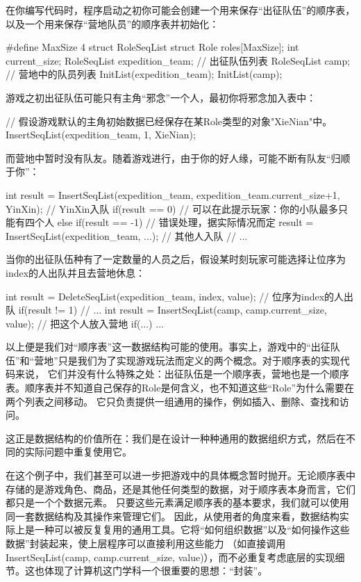 在你编写代码时，程序启动之初你可能会创建一个用来保存“出征队伍”的顺序表，以及一个用来保存“营地队员”的顺序表并初始化：
\begin{cppcode}
    #define MaxSize 4
    struct RoleSeqList {
        struct Role roles[MaxSize];
        int current_size;
    }
    RoleSeqList expedition_team; // 出征队伍列表
    RoleSeqList camp;    // 营地中的队员列表
    InitList(expedition_team);
    InitList(camp);
\end{cppcode}
游戏之初出征队伍可能只有主角“邪念”一个人，最初你将邪念加入表中：
\begin{cppcode}
    // 假设游戏默认的主角初始数据已经保存在某Role类型的对象"XieNian"中。
    InsertSeqList(expedition_team, 1, XieNian);
\end{cppcode}
而营地中暂时没有队友。随着游戏进行，由于你的好人缘，可能不断有队友“归顺于你”：
\begin{cppcode}
    int result = InsertSeqList(expedition_team, expedition_team.current_size+1, YinXin);    // YinXin入队
    if(result == 0) {
        // 可以在此提示玩家：你的小队最多只能有四个人
    } else if(result == -1) {
        // 错误处理，据实际情况而定
    }
    result = InsertSeqList(expedition_team, ...);   // 其他人入队
    // ...
\end{cppcode}
当你的出征队伍种有了一定数量的人员之后，假设某时刻玩家可能选择让位序为index的人出队并且去营地休息：
\begin{cppcode}
    int result = DeleteSeqList(expedition_team, index, value);  // 位序为index的人出队
    if(result != 1) {
        // ...
    }
    int result = InsertSeqList(camp, camp.current_size, value); // 把这个人放入营地
    if(...) {
        ...
    }
\end{cppcode}
以上便是我们对“顺序表”这一数据结构可能的使用。事实上，游戏中的“出征队伍”和“营地”只是我们为了实现游戏玩法而定义的两个概念。对于顺序表的实现代码来说，
它们并没有什么特殊之处：出征队伍是一个顺序表，营地也是一个顺序表。顺序表并不知道自己保存的Role是何含义，也不知道这些“Role”为什么需要在两个列表之间移动。
它只负责提供一组通用的操作，例如插入、删除、查找和访问。

这正是数据结构的价值所在：我们是在设计一种种通用的数据组织方式，然后在不同的实际问题中重复使用它。

在这个例子中，我们甚至可以进一步把游戏中的具体概念暂时抛开。无论顺序表中存储的是游戏角色、商品，还是其他任何类型的数据，对于顺序表本身而言，它们都只是一个个数据元素。
只要这些元素满足顺序表的基本要求，我们就可以使用同一套数据结构及其操作来管理它们。
因此，从使用者的角度来看，数据结构实际上是一种可以被反复复用的通用工具。它将“如何组织数据”以及“如何操作这些数据”封装起来，使上层程序可以直接利用这些能力
（如直接调用InsertSeqList(camp, camp.current\_size, value)），而不必重复考虑底层的实现细节。这也体现了计算机这门学科一个很重要的思想：“封装”。


